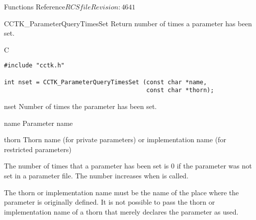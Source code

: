 \begin{cactuspart}{ Functions Reference}{$RCSfile$}{$Revision: 4641 $}
\begin{FunctionDescription}{CCTK\_ParameterQueryTimesSet}
\label{CCTK-ParameterQueryTimesSet}
Return number of times a parameter has been set.

\begin{SynopsisSection}
\begin{Synopsis}{C}
\begin{verbatim}
#include "cctk.h"

int nset = CCTK_ParameterQueryTimesSet (const char *name,
                                        const char *thorn);
\end{verbatim}
\end{Synopsis}
\end{SynopsisSection}

\begin{ResultSection}
\begin{Result}{nset}
Number of times the parameter has been set.
\end{Result}
\end{ResultSection}

\begin{ParameterSection}
\begin{Parameter}{name}
Parameter name
\end{Parameter}
\begin{Parameter}{thorn}
Thorn name (for private parameters) or implementation name (for
restricted parameters)
\end{Parameter}
\end{ParameterSection}

\begin{Discussion}
The number of times that a parameter has been set is 0 if the
parameter was not set in a parameter file.  The number increases when
 is called.

The thorn or implementation name must be the name of the place where
the parameter is originally defined.  It is not possible to pass the
thorn or implementation name of a thorn that merely declares the
parameter as used.
\end{Discussion}


\end{FunctionDescription}
\end{cactuspart}

